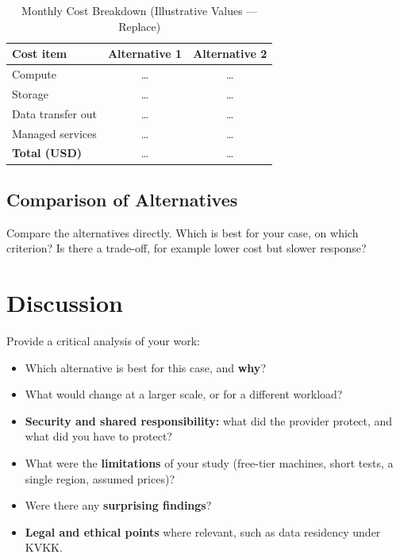 \documentclass[conference,a4paper]{IEEEtran}
\begin{document}
	\begin{table}[htbp]
		\caption{Monthly Cost Breakdown (Illustrative Values --- Replace)}
		\begin{center}
			\begin{tabular}{|l|c|c|}
				\hline
				\textbf{Cost item} & \textbf{Alternative 1} & \textbf{Alternative 2} \\
				\hline
				Compute & \ldots & \ldots \\
				\hline
				Storage & \ldots & \ldots \\
				\hline
				Data transfer out & \ldots & \ldots \\
				\hline
				Managed services & \ldots & \ldots \\
				\hline
				\textbf{Total (USD)} & \ldots & \ldots \\
				\hline
			\end{tabular}
			\label{tab:cost}
		\end{center}
	\end{table}
	
	\subsection{Comparison of Alternatives}
	Compare the alternatives directly. Which is best for your case, on which criterion? Is there a trade-off, for example lower cost but slower response?
	
	\section{Discussion}
	\label{sec:discussion}
	
	Provide a critical analysis of your work:
	\begin{itemize}
		\item Which alternative is best for this case, and \textbf{why}?
		\item What would change at a larger scale, or for a different workload?
		\item \textbf{Security and shared responsibility:} what did the provider protect, and what did you have to protect?
		\item What were the \textbf{limitations} of your study (free-tier machines, short tests, a single region, assumed prices)?
		\item Were there any \textbf{surprising findings}?
		\item \textbf{Legal and ethical points} where relevant, such as data residency under KVKK.
	\end{itemize}
	
\end{document}

